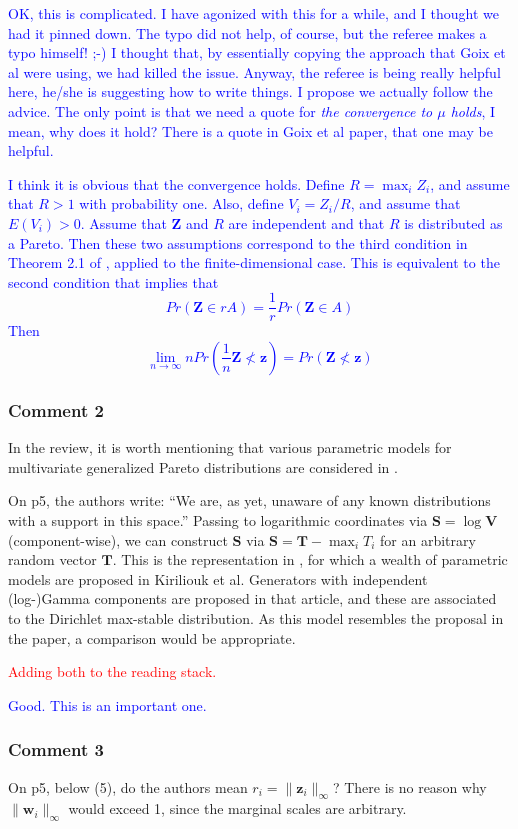 \documentclass[10pt]{article}
\newcommand{\bruno}[1]{\textcolor{blue}{#1}} %
\newcommand{\peter}[1]{\textcolor{red}{#1}}  %
\begin{document}
\bruno{OK, this is complicated. I have agonized with this for a while, and I thought we had it pinned down. The typo did not help, of course, but the referee makes a typo himself! ;-) I thought that, by essentially copying the approach that Goix et al were using, we had killed the issue. Anyway, the referee is being really helpful here, he/she is suggesting how to write things. I propose we actually follow the advice. The only point is that we need a quote for \emph{the convergence to $\mu$ holds}, I mean, why does it hold? There is a quote in Goix et al paper, that one may be helpful.}

\bruno{I think it is obvious that the convergence holds. Define  $R = \max_{i} Z_i$, and assume that $R>1$ with probability one. Also, define $V_i = Z_i/R$, and assume that $E(V_i)>0$. Assume that $ \bm{Z}$ and $R$ are independent and that $R$ is distributed as a Pareto. Then these two assumptions correspond to the third condition in Theorem 2.1 of
\cite{ferreira2014}, applied to the finite-dimensional case. This is equivalent to the second condition that implies that
\[
    Pr(\bm{Z}\in r A) = \frac{1}{r} Pr(\bm{Z} \in A) 
\]
Then
\[
  \lim_{n\rightarrow\infty} n Pr(\frac{1}{n}\bm{Z} \not < \bm{z}) =  Pr(\bm{Z}\not < \bm{z})
\]
}
\subsubsection*{Comment 2}
In the review, it is worth mentioning that various parametric models for multivariate generalized Pareto distributions are considered in \cite{kiriliouk2018}.

On p5, the authors write: “We are, as yet, unaware of any known distributions with a support in this space.” Passing to logarithmic coordinates via $\bm{S} = \log\bm{V}$ (component-wise), we can construct $\bm{S}$ via $\bm{S} = \bm{T} - \max_i T_i$  for an arbitrary random vector $\bm{T}$. This is the representation in \cite{rootzen2018mgpd}, for which a wealth of parametric models are proposed in Kiriliouk et al. Generators with independent (log-)Gamma components are proposed in that article, and these are associated to the Dirichlet max-stable distribution. As this model resembles the proposal in the paper, a comparison would be appropriate.

\peter{Adding both to the reading stack.}

\bruno{Good. This is an important one.}
\subsubsection*{Comment 3}
On p5, below (5), do the authors mean $r_i = \lVert\bm{z}_i\rVert_{\infty}$? There is no reason why $\lVert \bm{w}_i\rVert_{\infty}$ would exceed 1, since the marginal scales are arbitrary. 
\end{document}
